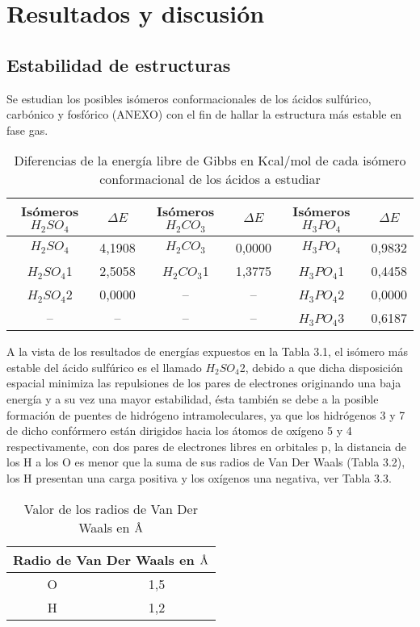 \chapter{Resultados y discusión}

\section{Estabilidad de estructuras}



Se estudian los posibles isómeros conformacionales de los ácidos sulfúrico, carbónico y fosfórico (ANEXO) con el fin de hallar la estructura más estable en fase gas. \\

  \begin{table}[H]
\begin{center}
\begin{tabular}{|c|c|c|c|c|c|}
\hline
Isómeros $H_2SO_4$ & $\Delta E$ & Isómeros $H_2CO_3$ & $\Delta E$ & Isómeros $H_3PO_4$ & $\Delta E$ \\ \hline
$H_2SO_4$ & 4,1908 & $H_2CO_3$ & 0,0000 & $H_3PO_4$ & 0,9832 \\ \hline
$H_2SO_4$1 & 2,5058 & $H_2CO_3$1 & 1,3775 & $H_3PO_4$1 & 0,4458 \\ \hline
$H_2SO_4$2 & 0,0000 & -- & -- & $H_3PO_4$2 & 0,0000 \\ \hline
-- & -- & -- & -- & $H_3PO_4$3 & 0,6187 \\ \hline
\end{tabular}
\caption{Diferencias de la energía libre de Gibbs en Kcal/mol de cada isómero conformacional de los ácidos a estudiar}
\label{tab:3.1}
\end{center}
\end{table}
A la vista de los resultados de energías expuestos en la Tabla 3.1, el isómero más estable del ácido sulfúrico es el llamado $H_2SO_4$2, debido a que dicha disposición espacial minimiza las repulsiones de los pares de electrones originando una baja energía y a su vez una mayor estabilidad, ésta también se debe a la posible formación de puentes de hidrógeno intramoleculares, ya que los hidrógenos 3 y 7 de dicho confórmero están dirigidos hacia los átomos de oxígeno 5 y 4 respectivamente, con dos pares de electrones libres en orbitales p, la distancia de los H a los O es menor que la suma de sus radios de Van Der Waals (Tabla 3.2), los H presentan una carga positiva y los oxígenos una negativa, ver Tabla 3.3.
	\begin{table}[H]
\begin{center}
\begin{tabular}{|c|c|}
	\hline
	\multicolumn{2}{|c|}{Radio de Van Der Waals en $\mbox{\normalfont\AA}$} \\ \hline
	O & 1,5 \\ \hline
	H & 1,2 \\ \hline
\end{tabular}
\caption{Valor de los radios de Van Der Waals en $\mbox{\normalfont\AA}$}
\end{center}	
\end{table}
